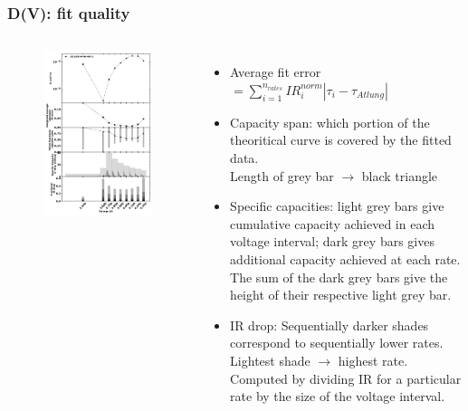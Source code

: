 \documentclass{beamer}
\begin{document}
\begin{frame}
\frametitle{D(V): fit quality}

\begin{columns}
	\fontsize{10}{8}
	
	\vspace{-0.5cm}
	\begin{figure}
		\includegraphics[width=0.95\linewidth]{figs/D-V_Li112Ni44Mn44O2_r-05um.jpg}
	\end{figure}
	
	\begin{itemize}
		\item Average fit error $= \sum_{i=1}^{n_{rates}}IR^{norm}_{i}|\tau_i - \tau_{Atlung}|$ 
		\item Capacity span: which portion of the theoritical curve is covered by the fitted data.\\
			  Length of grey bar $\rightarrow$ black triangle
		\item Specific capacities: light grey bars give cumulative capacity achieved in each voltage interval; 
		      dark grey bars gives additional capacity achieved at each rate. The sum of the dark grey bars give the height of their respective light grey bar.
		\item IR drop: Sequentially darker shades correspond to sequentially lower rates. Lightest shade $\rightarrow$ highest rate. Computed by 
			  dividing IR for a particular rate by the size of the voltage interval. 
	\end{itemize}
	

\end{columns}
\end{frame}
\end{document}
